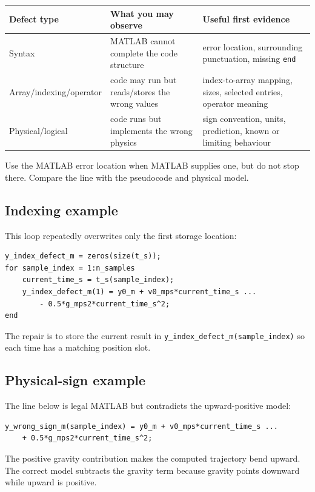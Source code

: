 \documentclass[11pt,a4paper]{article}
\begin{document}
\begin{center}\footnotesize\begin{tabular}{>{\raggedright\arraybackslash}p{.24\linewidth}>{\raggedright\arraybackslash}p{.31\linewidth}>{\raggedright\arraybackslash}p{.34\linewidth}}\toprule
\textbf{Defect type} & \textbf{What you may observe} & \textbf{Useful first evidence}\\ \midrule
Syntax & MATLAB cannot complete the code structure & error location, surrounding punctuation, missing \texttt{end}\\
Array/indexing/operator & code may run but reads/stores the wrong values & index-to-array mapping, sizes, selected entries, operator meaning\\
Physical/logical & code runs but implements the wrong physics & sign convention, units, prediction, known or limiting behaviour\\ \bottomrule
\end{tabular}\end{center}

Use the MATLAB error location when MATLAB supplies one, but do not stop there. Compare the line with the pseudocode and physical model.

\subsection*{Indexing example}
This loop repeatedly overwrites only the first storage location:
\begin{lstlisting}[style=matlabstyle,caption={Indexing defect that overwrites the first output slot}]
y_index_defect_m = zeros(size(t_s));
for sample_index = 1:n_samples
    current_time_s = t_s(sample_index);
    y_index_defect_m(1) = y0_m + v0_mps*current_time_s ...
        - 0.5*g_mps2*current_time_s^2;
end
\end{lstlisting}
The repair is to store the current result in \texttt{y\_index\_defect\_m(sample\_index)} so each time has a matching position slot.

\subsection*{Physical-sign example}
The line below is legal MATLAB but contradicts the upward-positive model:
\begin{lstlisting}[style=matlabstyle,caption={Physical-sign defect with an incorrect gravity contribution}]
y_wrong_sign_m(sample_index) = y0_m + v0_mps*current_time_s ...
    + 0.5*g_mps2*current_time_s^2;
\end{lstlisting}
The positive gravity contribution makes the computed trajectory bend upward. The correct model subtracts the gravity term because gravity points downward while upward is positive.
\end{document}
